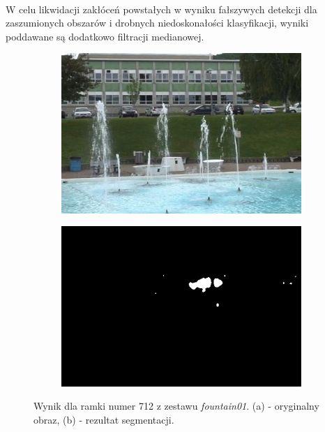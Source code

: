 \paragraph{}
W celu likwidacji zakłóceń powstałych w wyniku fałszywych detekcji dla zaszumionych obszarów i drobnych niedoskonałości klasyfikacji, wyniki poddawane są dodatkowo filtracji medianowej.

\begin{figure}[!h]
\centering
\begin{subfigure}[b]{0.4\textwidth}
\includegraphics[width=\textwidth]{img/GMMIn}
\caption{}
\end{subfigure}
\quad
\begin{subfigure}[b]{0.4\textwidth}
\includegraphics[width=\textwidth]{img/PBASOut}
\caption{}
\end{subfigure}
\caption{Wynik dla ramki numer 712 z zestawu \textit{fountain01}. (a) - oryginalny obraz, (b) - rezultat segmentacji.\label{fig:PBAS}}
\end{figure}